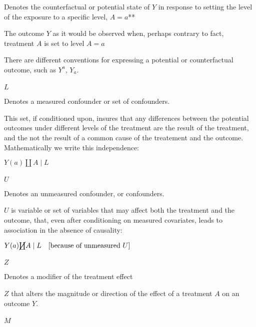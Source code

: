 \documentclass[
  single column]{article}
\makeatletter
\let\oldparagraph\paragraph
\renewcommand{\paragraph}{
    \@ifstar
      \xxxParagraphStar
      \xxxParagraphNoStar
  }
\newcommand{\xxxParagraphStar}[1]{\oldparagraph*{#1}\mbox{}}
\newcommand{\xxxParagraphNoStar}[1]{\oldparagraph{#1}\mbox{}}
\makeatother
\begin{document}
Denotes the counterfactual or potential state of \(Y\) in response to
setting the level of the exposure to a specific level, \(A=a\)**

The outcome \(Y\) as it would be observed when, perhaps contrary to
fact, treatment \(A\) is set to level \(A=a\)

There are different conventions for expressing a potential or
counterfactual outcome, such as \(Y^a\), \(Y_a\).

\paragraph{\texorpdfstring{\(L\)}{L}}\label{l}

Denotes a measured confounder or set of confounders.

This set, if conditioned upon, insures that any differences between the
potential outcomes under different levels of the treatment are the
result of the treatment, and the not the result of a common cause of the
treatement and the outcome. Mathematically we write this independence:

\(Y(a)\coprod A \mid L\)

\paragraph{\texorpdfstring{\(U\)}{U}}\label{u}

Denotes an unmeasured confounder, or confounders.

\(U\) is variable or set of variables that may affect both the treatment
and the outcome, that, even after conditioning on measured covariates,
leads to association in the absence of causality:

\(Y(a) \cancel\coprod A \mid L \quad \text{[because of unmeasured } U]\)

\paragraph{\texorpdfstring{\(Z\)}{Z}}\label{z}

Denotes a modifier of the treatment effect

\(Z\) that alters the magnitude or direction of the effect of a
treatment \(A\) on an outcome \(Y\).

\paragraph{\texorpdfstring{\(M\)}{M}}\label{m}
\end{document}
